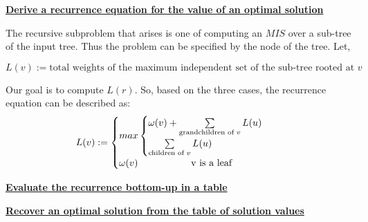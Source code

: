 \documentclass[11pt]{article}
\begin{document}
\begin{enumerate}
  \underline{\textbf{Derive a recurrence equation for the value of an
      optimal solution}}

  The recursive subproblem that arises is one of computing an $MIS$ over
  a sub-tree of the input tree. Thus the problem can be specified
  by the node of the tree. Let,

  \begin{equation}
    L(v) := \text{total weights of the maximum independent set of the
      sub-tree rooted at } v
  \end{equation}

  Our goal is to compute $L(r)$.
  So, based on the three cases, the recurrence equation can be
  described as:
  \begin{equation}
    L(v) := \begin{cases}
      max\begin{cases}
      \omega(v) + \sum\limits_{\text{grandchildren of } v} L(u)\\
      \sum\limits_{\text{children of }v} L(u)\\
      \end{cases}\\
      \omega(v) \-\hspace{5.5em} $v$ \text{ is a leaf} \\
    \end{cases}
  \end{equation}


  \underline{\textbf{Evaluate the recurrence bottom-up in a table}}


  \underline{\textbf{Recover an optimal solution from the table of
      solution values}}

\end{enumerate}
\end{document}
